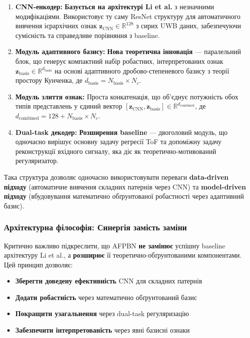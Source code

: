 \documentclass[12pt,a4paper]{article}
\begin{document}
\begin{enumerate}
	\item \textbf{CNN-енкодер:} \textbf{Базується на архітектурі Li et al.} з незначними модифікаціями. Використовує ту саму ResNet структуру для автоматичного вивчення ієрархічних ознак $\mathbf{z}_{\text{CNN}} \in \mathbb{R}^{128}$ з сирих UWB даних, забезпечуючи сумісність та справедливе порівняння з baseline.
	
\item \textbf{Модуль адаптивного базису:} \textbf{Нова теоретична інновація} — паралельний блок, що генерує компактний набір робастних, інтерпретованих ознак $\mathbf{z}_{\text{basis}} \in \mathbb{R}^{d_{\text{basis}}}$ на основі адаптивного дробово-степеневого базису з теорії простору Кунченка, де $d_{\text{basis}} = N_{\text{basis}} \times N_c$.
	
	\item \textbf{Модуль злиття ознак:} Проста конкатенація, що об'єднує потужність обох типів представлень у єдиний вектор $[\mathbf{z}_{\text{CNN}}, \mathbf{z}_{\text{basis}}] \in \mathbb{R}^{d_{\text{combined}}}$, де $d_{\text{combined}} = 128 + N_{\text{basis}} \times N_c$.
	
	\item \textbf{Dual-task декодер:} \textbf{Розширення baseline} — двоголовий модуль, що одночасно вирішує основну задачу регресії ToF та допоміжну задачу реконструкції вхідного сигналу, яка діє як теоретично-мотивований регуляризатор.
\end{enumerate}

Така структура дозволяє одночасно використовувати переваги \textbf{data-driven підходу} (автоматичне вивчення складних патернів через CNN) та \textbf{model-driven підходу} (вбудовування математично обґрунтованої робастності через адаптивний базис).

\subsubsection{Архітектурна філософія: Синергія замість заміни}

Критично важливо підкреслити, що AFPBN \textbf{не замінює} успішну baseline архітектуру Li et al., а \textbf{розширює} її теоретично-обґрунтованими компонентами. Цей принцип дозволяє:

\begin{itemize}
	\item \textbf{Зберегти доведену ефективність} CNN для складних патернів
	\item \textbf{Додати робастність} через математично обґрунтований базис  
	\item \textbf{Покращити узагальнення} через dual-task регуляризацію
	\item \textbf{Забезпечити інтерпретованість} через явні базисні ознаки
\end{itemize}
\end{document}
